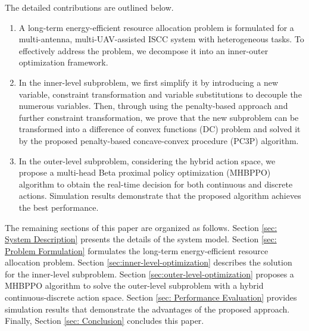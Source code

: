 \documentclass[10pt,journal,compsoc]{IEEEtran}
\begin{document}
The detailed contributions are outlined below.
\begin{enumerate}
        \item A long-term energy-efficient resource allocation problem is formulated for a multi-antenna, multi-UAV-assisted ISCC system with heterogeneous tasks. To effectively address the problem, we decompose it into an inner-outer optimization framework.
         

        \item In the inner-level subproblem, we first simplify it by introducing a new variable, constraint transformation and variable substitutions to decouple the numerous variables. Then, through using the penalty-based approach and further constraint transformation, we prove that the new subproblem can be transformed into a difference of convex functions (DC) problem and solved it by the proposed penalty-based concave-convex procedure (PC3P) algorithm.
        

        \item In the outer-level subproblem, considering the hybrid action space, we propose a multi-head Beta proximal policy optimization (MHBPPO) algorithm to obtain the real-time decision for both continuous and discrete actions. Simulation results demonstrate that the proposed algorithm achieves the best performance.
        
\end{enumerate}

The remaining sections of this paper are organized as follows.
Section \ref{sec: System Description} presents the details of the system model.
Section \ref{sec: Problem Formulation} formulates the long-term energy-efficient resource allocation problem.
Section \ref{sec:inner-level-optimization} describes the solution for the inner-level subproblem.
Section \ref{sec:outer-level-optimization} proposes a MHBPPO algorithm to solve the outer-level subproblem with a hybrid continuous-discrete action space.
Section \ref{sec: Performance Evaluation} provides simulation results that demonstrate the advantages of the proposed approach.
Finally, Section \ref{sec: Conclusion} concludes this paper.
\end{document}

